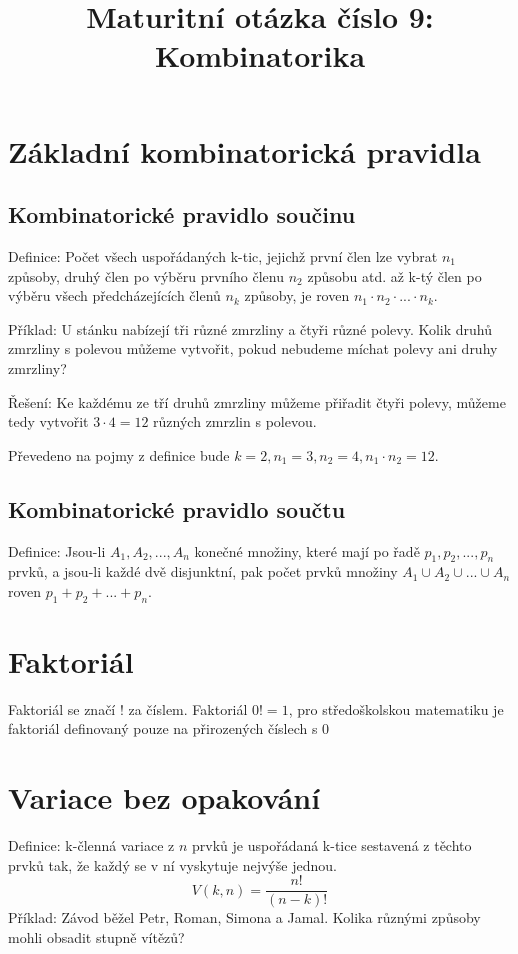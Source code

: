 \documentclass[12pt]{article}
\title{Maturitní otázka číslo 9: Kombinatorika}
\author{}
\date{}
\begin{document}
\maketitle

\section*{Základní kombinatorická pravidla}
\subsection*{Kombinatorické pravidlo součinu}
Definice: Počet všech uspořádaných k-tic, jejichž první člen lze vybrat $n_1$ způsoby, druhý člen po výběru prvního členu $n_2$ způsobu atd. až k-tý člen po výběru všech předcházejících členů $n_k$ způsoby, je roven $n_1 \cdot n_2 \cdot ... \cdot n_k$.

Příklad: U stánku nabízejí tři různé zmrzliny a čtyři různé polevy. Kolik druhů zmrzliny s polevou můžeme vytvořit, pokud nebudeme míchat polevy ani druhy zmrzliny?

Řešení: Ke každému ze tří druhů zmrzliny můžeme přiřadit čtyři polevy, můžeme tedy vytvořit $3 \cdot 4 = 12$ různých zmrzlin s polevou.

Převedeno na pojmy z definice bude $k = 2, n_1 = 3, n_2 = 4, n_1\cdot n_2 = 12$.

\subsection*{Kombinatorické pravidlo součtu}
Definice: Jsou-li $A_1, A_2, ..., A_n$ konečné množiny, které mají po řadě $p_1, p_2, ..., p_n$ prvků, a jsou-li každé dvě disjunktní, pak počet prvků množiny $A_1 \cup A_2 \cup ... \cup A_n$ roven $p_1 + p_2 + ... + p_n$.

\section*{Faktoriál}
Faktoriál se značí $!$ za číslem. Faktoriál $0! = 1$, pro středoškolskou matematiku je faktoriál definovaný pouze na přirozených číslech s $0$
\section*{Variace bez opakování}
Definice: k-členná variace z $n$ prvků je uspořádaná k-tice sestavená z těchto prvků tak, že každý se v ní vyskytuje nejvýše jednou.
\[V(k,n) = \frac{n!}{(n-k)!}\]
Příklad: Závod běžel Petr, Roman, Simona a Jamal. Kolika různými způsoby mohli obsadit stupně vítězů?
\end{document}
